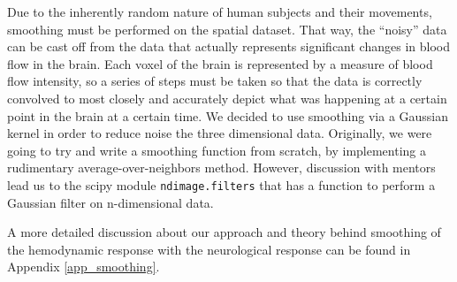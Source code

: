 \par \indent Due to the inherently random nature of human subjects and their 
movements, smoothing must be performed on the spatial dataset. That way, the 
``noisy'' data can be cast off from the data that actually represents 
significant changes in blood flow in the brain. Each voxel of the brain is 
represented by a measure of blood flow intensity, so a series of steps must 
be taken so that the data is correctly convolved to most closely and 
accurately depict what was happening at a certain point in the brain at a 
certain time. We decided to use smoothing via a Gaussian kernel in order to 
reduce noise the three dimensional data. Originally, we were going to try and 
write a smoothing function from scratch, by implementing a rudimentary 
average-over-neighbors method. However, discussion with mentors lead us to the 
scipy module \texttt{ndimage.filters} that has a function to perform a
Gaussian filter on n-dimensional data. 

\par \indent A more detailed discussion about our approach and theory behind 
smoothing of the hemodynamic response with the neurological response can be
found in Appendix \ref{app_smoothing}.

